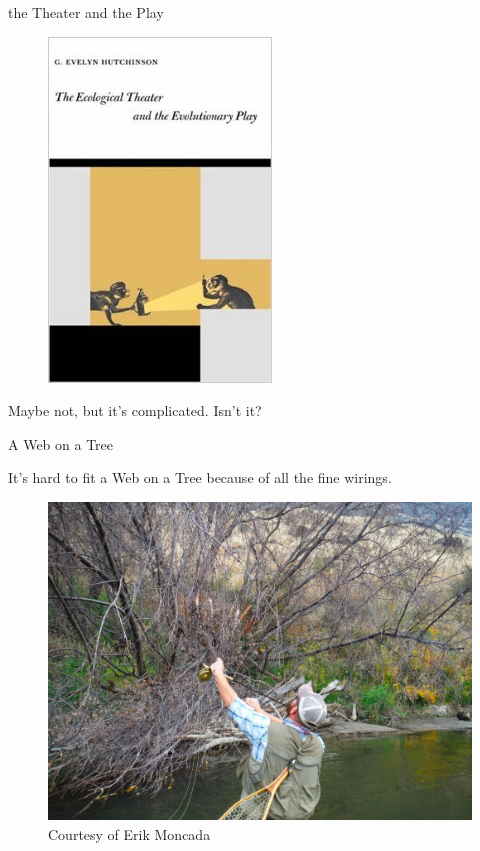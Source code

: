 \documentclass[ignorenonframetext,]{beamer}
\begin{document}
\begin{frame}{the Theater and the Play}

\begin{figure}
\centering
\includegraphics[height=0.5 \textheight]{images/hutchinson_ecotheatreevoplay.jpg}
\end{figure}

{\small Maybe not, but it's complicated. Isn't it?}

\end{frame}

\begin{frame}{A Web on a Tree}

It's hard to fit a Web on a Tree because of all the fine wirings.

\begin{figure}
\centering
\includegraphics[height=0.5 \textheight]{images/finewirings.jpg}
\caption{Courtesy of Erik Moncada}
\end{figure}

\end{frame}
\end{document}
